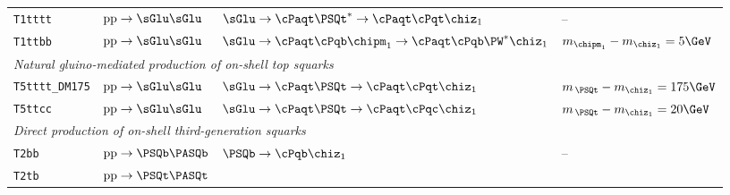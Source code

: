 \begin{table}[!t]
\begin{tabular}{ llll }
\texttt{T1tttt}        %
                                & $\text{pp}\ra\sGlu\sGlu$       
                                & $\sGlu\ra\cPaqt\PSQt^*\ra\cPaqt\cPqt\chiz_1$
                                & --                                                                             \\ [0.5ex]
\texttt{T1ttbb}        %
                                & $\text{pp}\ra\sGlu\sGlu$      
                                & $\sGlu\ra\cPaqt\cPqb\chipm_1\ra\cPaqt\cPqb\PW^*\chiz_1$
                                & $m_{\chipm_1} - m_{\chiz_1} = 5\GeV$                                           \\ [0.5ex]
\multicolumn{4}{l}{\it Natural gluino-mediated production of on-shell top squarks}                               \\ [0.5ex]
\texttt{T5tttt\_DM175}        %
                                & $\text{pp}\ra\sGlu\sGlu$      
                                & $\sGlu\ra\cPaqt\PSQt\ra\cPaqt\cPqt\chiz_1$ 
                                & $m_{\,\PSQt} - m_{\chiz_1} = 175\GeV$                                          \\ [0.5ex]
\texttt{T5ttcc}        %
                                & $\text{pp}\ra\sGlu\sGlu$       
                                & $\sGlu\ra\cPaqt\PSQt\ra\cPaqt\cPqc\chiz_1$ 
                                & $m_{\,\PSQt} - m_{\chiz_1} = 20\GeV$                                           \\ [0.5ex]
\multicolumn{4}{l}{\it Direct production of on-shell third-generation squarks}                                   \\ [0.5ex]
\texttt{T2bb}          %
                                & $\text{pp}\ra\PSQb\PASQb$     
                                & $\PSQb\ra\cPqb\chiz_1$
                                & --                                                                             \\ [0.5ex]
\texttt{T2tb}          %
                                & $\text{pp}\ra\PSQt\PASQt$     

\end{tabular}
\end{table}
